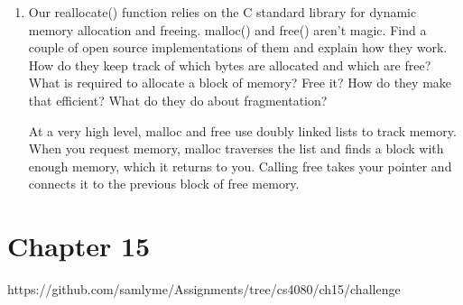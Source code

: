 \documentclass{article}
\begin{document}
\begin{enumerate}
    \item {
        Our reallocate() function relies on the C standard library for dynamic memory allocation and freeing. malloc() and free() aren’t magic. Find a couple of open source implementations of them and explain how they work. How do they keep track of which bytes are allocated and which are free? What is required to allocate a block of memory? Free it? How do they make that efficient? What do they do about fragmentation?

        At a very high level, malloc and free use doubly linked 
        lists to track memory. When you request memory,
        malloc traverses the list and finds a block with 
        enough memory, which it returns to you. Calling 
        free takes your pointer and connects it to the previous 
        block of free memory.
    }
\end{enumerate}

\section*{Chapter 15}
https://github.com/samlyme/Assignments/tree/cs4080/ch15/challenge
\end{document}
